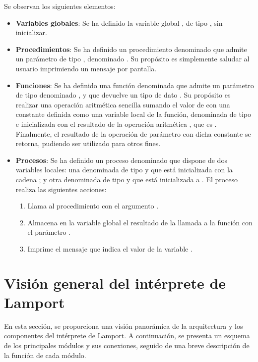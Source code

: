 \noindent
Se observan los siguientes elementos:
\begin{itemize}
    \item \textbf{Variables globales}: Se ha definido la variable global , de tipo , sin inicializar.
    \item \textbf{Procedimientos}: Se ha definido un procedimiento denominado  que admite un parámetro de tipo , denominado . Su propósito es simplemente saludar al usuario imprimiendo un mensaje por pantalla.
    \item \textbf{Funciones}: Se ha definido una función denominada  que admite un parámetro de tipo  denominado , y que devuelve un tipo de dato . Su propósito es realizar una operación aritmética sencilla sumando el valor de  con una constante definida como una variable local de la función, denominada  de tipo  e inicializada con el resultado de la operación aritmética , que es . Finalmente, el resultado de la operación de parámetro con dicha constante se retorna, pudiendo ser utilizado para otros fines.
    \item \textbf{Procesos}: Se ha definido un proceso denominado  que dispone de dos variables locales: una denominada  de tipo  y que está inicializada con la cadena ; y otra denominada  de tipo  y que está inicializada a . El proceso realiza las siguientes acciones:
    \begin{enumerate}
        \item Llama al procedimiento  con el argumento .
        \item Almacena en la variable global  el resultado de la llamada a la función  con el parámetro .
        \item Imprime el mensaje que indica el valor de la variable .
    \end{enumerate}
\end{itemize}

\section{Visión general del intérprete de Lamport}
En esta sección, se proporciona una visión panorámica de la arquitectura y los componentes del intérprete de Lamport. A continuación, se presenta un esquema de los principales módulos y sus conexiones, seguido de una breve descripción de la función de cada módulo.

